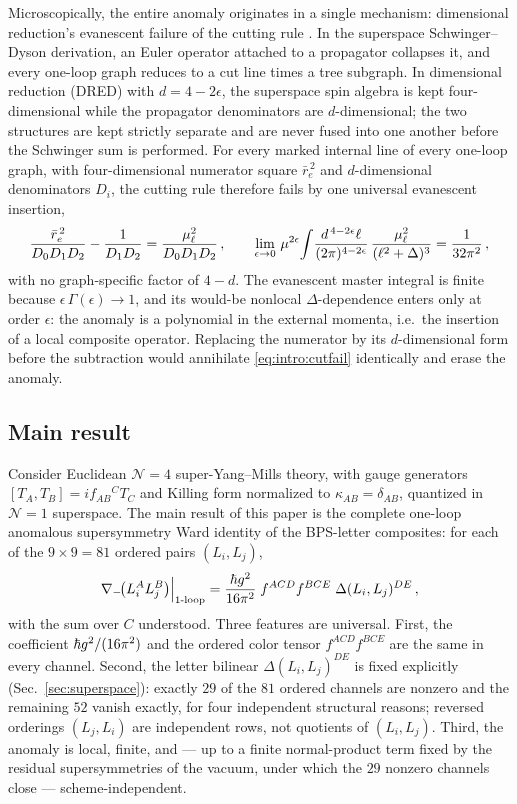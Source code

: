 Microscopically, the entire anomaly originates in a single mechanism: dimensional reduction's evanescent failure of the
cutting rule \cite{SiegelDRED}. In the superspace Schwinger--Dyson derivation, an Euler operator attached to a propagator
collapses it, and every one-loop graph reduces to a cut line times a tree subgraph. In dimensional reduction (DRED) with
$d=4-2\epsilon$, the superspace spin algebra is kept four-dimensional while the propagator denominators are
$d$-dimensional; the two structures are kept strictly separate and are never fused into one another before the Schwinger
sum is performed. For every marked internal line of every one-loop graph, with four-dimensional numerator square
$\bar r_e^{\,2}$ and $d$-dimensional denominators $D_i$, the cutting rule therefore fails by one universal evanescent
insertion,
\begin{equation}\label{eq:intro:cutfail}
\frac{\bar r_e^{\,2}}{D_0D_1D_2}-\frac{1}{D_1D_2}=\frac{\mu_\ell^2}{D_0D_1D_2}\,,
\qquad
\lim_{\epsilon\to0}\,\mu^{2\epsilon}\!\int\!\frac{d^{\,4-2\epsilon}\ell}{(2\pi)^{4-2\epsilon}}\,
\frac{\mu_\ell^2}{(\ell^2+\Delta)^3}=\frac{1}{32\pi^2}\,,
\end{equation}
with no graph-specific factor of $4-d$. The evanescent master integral is finite because
$\epsilon\,\Gamma(\epsilon)\to1$, and its would-be nonlocal $\Delta$-dependence enters only at order $\epsilon$: the
anomaly is a polynomial in the external momenta, i.e.\ the insertion of a local composite operator. Replacing the
numerator by its $d$-dimensional form before the subtraction would annihilate \eqref{eq:intro:cutfail} identically and
erase the anomaly.

\subsection{Main result}

Consider Euclidean $\mathcal N=4$ super-Yang--Mills theory, with gauge generators $[T_A,T_B]=i f_{AB}{}^C T_C$ and Killing
form normalized to $\kappa_{AB}=\delta_{AB}$, quantized in $\mathcal N=1$ superspace. The main result of this paper is the
complete one-loop anomalous supersymmetry Ward identity of the BPS-letter composites: for each of the $9\times9=81$
ordered pairs $(L_i,L_j)$,
\begin{equation}\label{eq:intro:master}
\nabla_-\!\bigl(L_i^A L_j^B\bigr)\Big|_{\text{1-loop}}
=\frac{\hbar g^2}{16\pi^2}\;f^{ACD}f^{BCE}\;\Delta(L_i,L_j)^{DE}\,,
\end{equation}
with the sum over $C$ understood. Three features are universal. First, the coefficient $\hbar g^2/(16\pi^2)$ and the ordered
color tensor $f^{ACD}f^{BCE}$ are the same in every channel. Second, the letter bilinear $\Delta(L_i,L_j)^{DE}$ is fixed
explicitly (Sec.~\ref{sec:superspace}): exactly $29$ of the $81$ ordered channels are nonzero and the remaining $52$
vanish exactly, for four independent structural reasons; reversed orderings $(L_j,L_i)$ are independent rows, not
quotients of $(L_i,L_j)$. Third, the anomaly is local, finite, and --- up to a finite normal-product term fixed by the
residual supersymmetries of the vacuum, under which the $29$ nonzero channels close --- scheme-independent.

